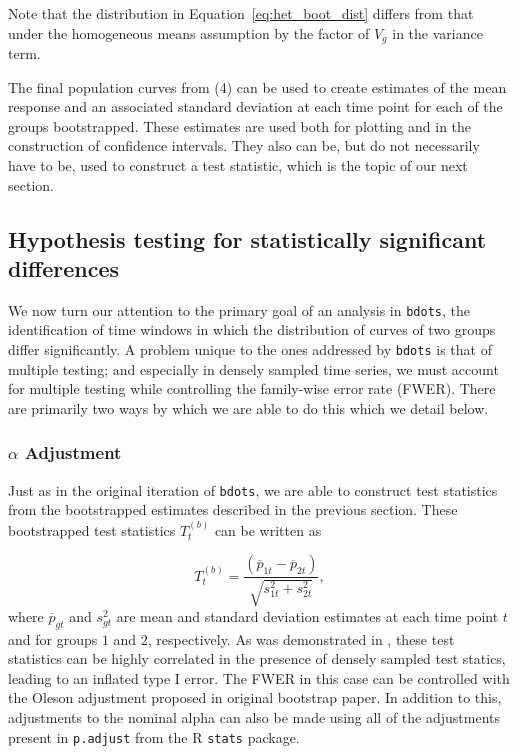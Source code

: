 \documentclass{article}
\newcommand{\xt}{\texttt}%
\begin{document}
Note that the distribution in Equation~\ref{eq:het_boot_dist} differs from that under the homogeneous means assumption by the factor of $V_g$ in the variance term.


The final population curves from (4) can be used to create estimates of the mean response and an associated standard deviation at each time point for each of the groups bootstrapped. These estimates are used both for plotting and in the construction of confidence intervals. They also can be, but do not necessarily have to be, used to construct a test statistic, which is the topic of our next section.

\subsection{Hypothesis testing for statistically significant differences}

We now turn our attention to the primary goal of an analysis in \xt{bdots}, the identification of time windows in which the distribution of curves of two groups differ significantly. A problem unique to the ones addressed by \xt{bdots} is that of multiple testing; and especially in densely sampled time series, we must account for multiple testing while controlling the family-wise error rate (FWER). There are primarily two ways by which we are able to do this which we detail below.

\subsubsection{$\alpha$ Adjustment}

Just as in the original iteration of \xt{bdots}, we are able to construct test statistics from the bootstrapped estimates described in the previous section. These bootstrapped test statistics $T_t^{(b)}$ can be written as 

\begin{equation}\label{eq:test_statistic}
T_t^{(b)} = \frac{(\overline{p}_{1t} - \overline{p}_{2t})}{\sqrt{s_{1t}^2 + s_{2t}^2}},
\end{equation}
where $\overline{p}_{gt}$ and $s_{gt}^2$ are mean and standard deviation estimates at each time point $t$ and for groups $1$ and $2$, respectively. As was demonstrated in \cite{oleson2017detecting}, these test statistics can be highly correlated in the presence of densely sampled test statics, leading to an inflated type I error. The FWER in this case can be controlled with the Oleson adjustment proposed in original bootstrap paper. In addition to this, adjustments to the nominal alpha can also be made using all of the adjustments present in \xt{p.adjust} from the R \xt{stats} package.
\end{document}
